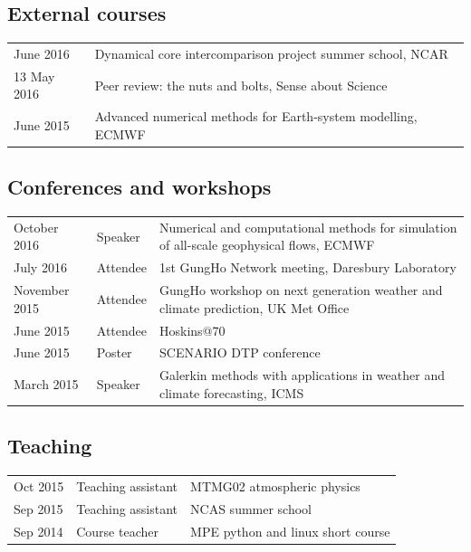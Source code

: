 \documentclass[a4paper,11pt]{article}
\begin{document}
\subsection*{External courses}
\begin{tabular}{l l}
June 2016 & Dynamical core intercomparison project summer school, NCAR \\
13 May 2016 & Peer review: the nuts and bolts, Sense about Science \\
June 2015 & Advanced numerical methods for Earth-system modelling, ECMWF \\
\end{tabular}

\subsection*{Conferences and workshops}
\begin{tabularx}{\linewidth}{l l X}
October 2016 & Speaker & Numerical and computational methods for simulation of all-scale geophysical flows, ECMWF \\
July 2016 & Attendee & 1st GungHo Network meeting, Daresbury Laboratory \\
November 2015 & Attendee & GungHo workshop on next generation weather and climate prediction, UK Met Office \\
June 2015 & Attendee & Hoskins@70 \\
June 2015 & Poster & SCENARIO DTP conference \\
March 2015 & Speaker & Galerkin methods with applications in weather and climate forecasting, ICMS \\
\end{tabularx}

\subsection*{Teaching}
\begin{tabular}{l l l}
Oct 2015 & Teaching assistant & MTMG02 atmospheric physics \\
Sep 2015 & Teaching assistant & NCAS summer school \\
Sep 2014 & Course teacher & MPE python and linux short course \\
\end{tabular}
\end{document}

